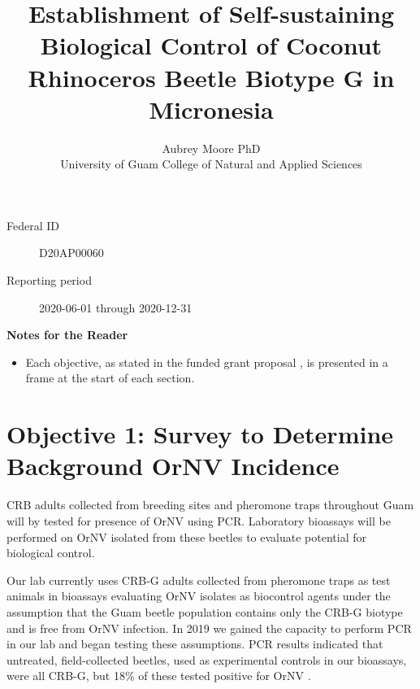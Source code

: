 \documentclass[12pt,letterpaper,english,bibliography=totocnumbered, abstract=on]{scrartcl}
\begin{document}
\titlehead{Progress Report 1: DOI-OIA Coral Reef and Natural Resources Initiative FY2020}

\title{Establishment of Self-sustaining Biological Control of Coconut Rhinoceros Beetle Biotype G in Micronesia }

\author{Aubrey Moore PhD\\University of Guam College of Natural and Applied Sciences}

\date{}

\maketitle

\begin{description}
	\item[Federal ID] D20AP00060
	\item[Reporting period] 2020-06-01 through 2020-12-31
\end{description}

\tableofcontents

\clearpage


\textbf{Notes for the Reader}

\begin{itemize}

\item Each objective, as stated in the funded grant proposal \cite{mooreGrantProposalDOIOIA2020}, is presented in a frame at the start of each section. 

\end{itemize}

\listoftodos


\clearpage
\section{Objective 1: Survey to Determine Background OrNV Incidence} 

\begin{framed}
CRB adults collected from breeding sites and pheromone traps throughout Guam will by tested for presence of OrNV using PCR.  Laboratory bioassays will be performed on OrNV isolated from these beetles to evaluate potential for biological control.
\end{framed} 

Our lab currently uses CRB-G adults collected from pheromone traps as test animals in bioassays evaluating OrNV isolates as biocontrol agents under the assumption that the Guam beetle population contains only the CRB-G biotype and is free from OrNV infection. In 2019 we gained the capacity to perform PCR in our lab and began testing these assumptions. PCR results indicated that untreated, field-collected beetles, used as experimental controls in our bioassays, were all CRB-G, but 18\% of these tested positive for OrNV \cite{grasela_technical_2020, graselaTechnicalReportPolymerase2020, graselaTechnicalReportPolymerase2020a}.
\end{document}
